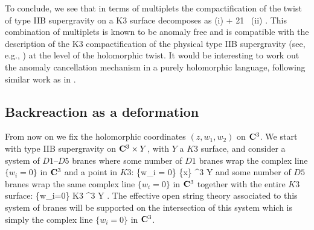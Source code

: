 \documentclass[../main.tex]{subfiles}
\begin{document}
To conclude, we see that in terms of multiplets the compactification of the twist of type IIB supergravity on a K3 surface decomposes as
\beqn
{} \rightsquigarrow (i) + 21 \, (ii) .
\eeqn
This combination of multiplets is known to be anomaly free and is compatible with the description of the K3 compactification of the physical type IIB supergravity (see, e.g., \cite{Townsend:1983xt}) at the level of the holomorphic twist.
It would be interesting to work out the anomaly cancellation mechanism in a purely holomorphic language, following similar work as in \cite{CLtypeI}.

\subsection{Backreaction as a deformation} 
\label{sec:conifold}

From now on we fix the holomorphic coordinates $(z,w_1,w_2)$ on $\mathbf{C}^3$.
We start with type IIB supergravity on $\mathbf{C}^3 \times Y$, with $Y$ a $K3$ surface, and consider a system of $D1$--$D5$ branes where some number of $D1$ branes wrap the complex line $\{w_i=0\}$ in $\mathbf{C}^3$ and a point in $K3$:
\beqn
\{w_i = 0\} \times \{x\} \subset \C^3 \times Y
\eeqn
and some number of $D5$ branes wrap the same complex line $\{w_i=0\}$ in $\mathbf{C}^3$ together with the entire $K3$ surface:
\beqn
\{w_i=0\} \times K3 \subset \C^3 \times Y .
\eeqn
The effective open string theory associated to this system of branes will be supported on the intersection of this system which is simply the complex line $\{w_i=0\}$ in $\mathbf{C}^3$.
\end{document}
